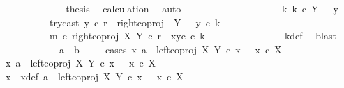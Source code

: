 \begin{isabellebody}
\ \ \ \ \ \ \ \ \ \ \isamarkupfalse%
\ \isamarkupfalse%
\ {\isacharquery}{\kern0pt}thesis\ \isamarkupfalse%
\ calculation\ \isamarkupfalse%
\ auto\isanewline
\ \ \ \ \ \ \ \ \isamarkupfalse%
\isanewline
\ \ \ \ \ \ \ \ \isamarkupfalse%
\ \isamarkupfalse%
\ {\isachardoublequoteopen}{\isasymexists}k{\isachardot}{\kern0pt}\ k\ {\isasymin}\isactrlsub c\ Y\ {\isasymsetminus}\ {\isacharparenleft}{\kern0pt}{\isasymone}{\isacharcomma}{\kern0pt}\ y{}{\isacharparenright}{\kern0pt}\ {\isasymand}\isanewline
\ \ \ \ \ \ \ \ \ \ try{\isacharunderscore}{\kern0pt}cast\ y{}\ {\isasymcirc}\isactrlsub c\ r\ {\isacharequal}{\kern0pt}\ right{\isacharunderscore}{\kern0pt}coproj\ {\isasymone}\ {\isacharparenleft}{\kern0pt}Y\ {\isasymsetminus}\ {\isacharparenleft}{\kern0pt}{\isasymone}{\isacharcomma}{\kern0pt}\ y{}{\isacharparenright}{\kern0pt}{\isacharparenright}{\kern0pt}\ {\isasymcirc}\isactrlsub c\ k\ {\isasymand}\ \isanewline
\ \ \ \ \ \ \ \ \ \ m\ {\isasymcirc}\isactrlsub c\ right{\isacharunderscore}{\kern0pt}coproj\ X\ Y\ {\isasymcirc}\isactrlsub c\ r\ {\isacharequal}{\kern0pt}\ {\isasymlangle}x{}{\isacharcomma}{\kern0pt}y{}\isactrlsup c\ {\isasymcirc}\isactrlsub c\ k{\isasymrangle}{\isachardoublequoteclose}\isanewline
\ \ \ \ \ \ \ \ \ \ \ \ \ \ \isamarkupfalse%
\ k{\isacharunderscore}{\kern0pt}def\ \isamarkupfalse%
\ blast\isanewline
\ \ \ \ \isamarkupfalse%
\isanewline
\ \isanewline
\ \ \ \ \isamarkupfalse%
\ {\isachardoublequoteopen}a\ {\isacharequal}{\kern0pt}\ b{\isachardoublequoteclose}\isanewline
\ \ \ \ \isamarkupfalse%
{\isacharparenleft}{\kern0pt}cases\ {\isachardoublequoteopen}{\isasymexists}x{\isachardot}{\kern0pt}\ a\ {\isacharequal}{\kern0pt}\ left{\isacharunderscore}{\kern0pt}coproj\ X\ Y\ {\isasymcirc}\isactrlsub c\ x\ \ {\isasymand}\ x\ {\isasymin}\isactrlsub c\ X{\isachardoublequoteclose}{\isacharparenright}{\kern0pt}\isanewline
\ \ \ \ \ \ \isamarkupfalse%
\ {\isachardoublequoteopen}{\isasymexists}x{\isachardot}{\kern0pt}\ a\ {\isacharequal}{\kern0pt}\ left{\isacharunderscore}{\kern0pt}coproj\ X\ Y\ {\isasymcirc}\isactrlsub c\ x\ \ {\isasymand}\ x\ {\isasymin}\isactrlsub c\ X{\isachardoublequoteclose}\isanewline
\ \ \ \ \ \ \isamarkupfalse%
\ \isamarkupfalse%
\ x\ \ x{\isacharunderscore}{\kern0pt}def{\isacharcolon}{\kern0pt}\ {\isachardoublequoteopen}a\ {\isacharequal}{\kern0pt}\ left{\isacharunderscore}{\kern0pt}coproj\ X\ Y\ {\isasymcirc}\isactrlsub c\ x\ \ {\isasymand}\ x\ {\isasymin}\isactrlsub c\ X{\isachardoublequoteclose}\isanewline

\end{isabellebody}
